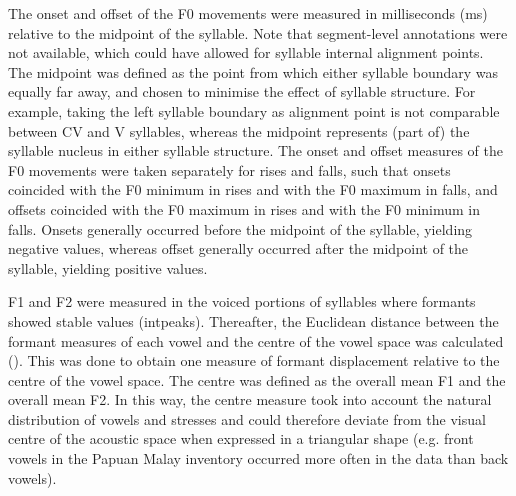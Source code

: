 The onset and offset of the F0 movements were measured in milliseconds (ms) relative to the midpoint of the syllable. Note that segment-level annotations were not available, which could have allowed for syllable internal alignment points. The midpoint was defined as the point from which either syllable boundary was equally far away, and chosen to minimise the effect of syllable structure. For example, taking the left syllable boundary as alignment point is not comparable between CV and V syllables, whereas the midpoint represents (part of) the syllable nucleus in either syllable structure. The onset and offset measures of the F0 movements were taken separately for rises and falls, such that onsets coincided with the F0 minimum in rises and with the F0 maximum in falls, and offsets coincided with the F0 maximum in rises and with the F0 minimum in falls. Onsets generally occurred before the midpoint of the syllable, yielding negative values, whereas offset generally occurred after the midpoint of the syllable, yielding positive values.\par

F1 and F2 were measured in the voiced portions of syllables where formants showed stable values (intpeaks). Thereafter, the Euclidean distance between the formant measures of each vowel and the centre of the vowel space was calculated (\citealt{harrington_phonetic_2010}). This was done to obtain one measure of formant displacement relative to the centre of the vowel space. The centre was defined as the overall mean F1 and the overall mean F2. In this way, the centre measure took into account the natural distribution of vowels and stresses and could therefore deviate from the visual centre of the acoustic space when expressed in a triangular shape (e.g. front vowels in the Papuan Malay inventory occurred more often in the data than back vowels).

